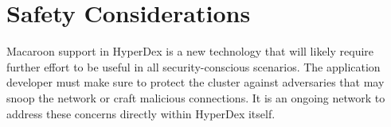 \section{Safety Considerations}

Macaroon support in HyperDex is a new technology that will likely require
further effort to be useful in all security-conscious scenarios.  The
application developer must make sure to protect the cluster against adversaries
that may snoop the network or craft malicious connections.  It is an ongoing
network to address these concerns directly within HyperDex itself.
